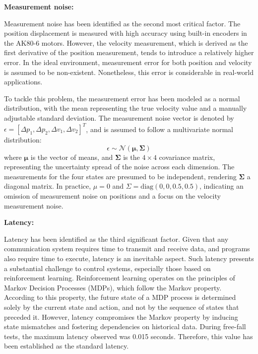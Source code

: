 \textbf{Measurement noise:}

Measurement noise has been identified as the second most critical factor. The position displacement is measured with high accuracy using built-in encoders in the AK80-6 motors. However, the velocity measurement, which is derived as the first derivative of the position measurement, tends to introduce a relatively higher error. In the ideal environment, measurement error for both position and velocity is assumed to be non-existent. Nonetheless, this error is considerable in real-world applications.

To tackle this problem, the measurement error has been modeled as a normal distribution, with the mean representing the true velocity value and a manually adjustable standard deviation. The measurement noise vector is denoted by \(\epsilon = [\Delta p_1, \Delta p_2, \Delta v_1, \Delta v_2]^T\), and is assumed to follow a multivariate normal distribution:
\begin{equation}
\epsilon \sim \mathcal{N}(\boldsymbol{\mu}, \boldsymbol{\Sigma})
\end{equation}
where \(\boldsymbol{\mu}\) is the vector of means, and \(\boldsymbol{\Sigma}\) is the \(4 \times 4\) covariance matrix, representing the uncertainty spread of the noise across each dimension. The measurements for the four states are presumed to be independent, rendering \(\boldsymbol{\Sigma}\) a diagonal matrix. In practice, \(\mu = 0\) and \(\Sigma = \text{diag}(0,0,0.5,0.5)\), indicating an omission of measurement noise on positions and a focus on the velocity measurement noise.

\textbf{Latency:}

Latency has been identified as the third significant factor. Given that any communication system requires time to transmit and receive data, and programs also require time to execute, latency is an inevitable aspect. Such latency presents a substantial challenge to control systems, especially those based on reinforcement learning. Reinforcement learning operates on the principles of Markov Decision Processes (MDPs), which follow the Markov property. According to this property, the future state of a MDP process is determined solely by the current state and action, and not by the sequence of states that preceded it. However, latency compromises the Markov property by inducing state mismatches and fostering dependencies on historical data. During free-fall tests, the maximum latency observed was 0.015 seconds. Therefore, this value has been established as the standard latency.

